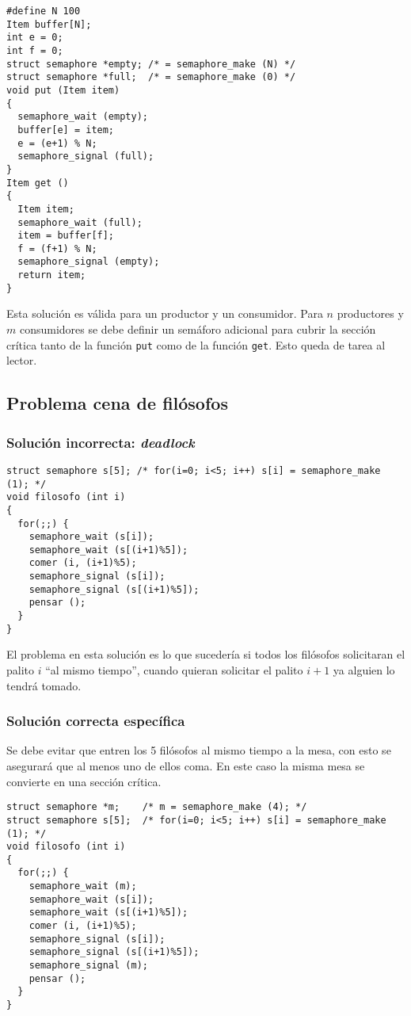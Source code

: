 \begin{lstlisting}
#define N 100
Item buffer[N];
int e = 0;
int f = 0;
struct semaphore *empty; /* = semaphore_make (N) */
struct semaphore *full;  /* = semaphore_make (0) */
void put (Item item)
{
  semaphore_wait (empty);
  buffer[e] = item;
  e = (e+1) % N;
  semaphore_signal (full);
}
Item get ()
{
  Item item;
  semaphore_wait (full);
  item = buffer[f];
  f = (f+1) % N;
  semaphore_signal (empty);
  return item;
}
\end{lstlisting}

Esta solución es válida para un productor y un consumidor. Para $n$ productores
y $m$ consumidores se debe definir un semáforo adicional para cubrir la sección
crítica tanto de la función \texttt{put} como de la función \texttt{get}. Esto
queda de tarea al lector.

\subsection{Problema cena de filósofos}

\subsubsection{Solución incorrecta: \emph{deadlock}}

\begin{lstlisting}
struct semaphore s[5]; /* for(i=0; i<5; i++) s[i] = semaphore_make (1); */
void filosofo (int i)
{
  for(;;) {
    semaphore_wait (s[i]);
    semaphore_wait (s[(i+1)%5]);
    comer (i, (i+1)%5);
    semaphore_signal (s[i]);
    semaphore_signal (s[(i+1)%5]);
    pensar ();
  }
}
\end{lstlisting}

El problema en esta solución es lo que sucedería si todos los filósofos
solicitaran el palito $i$ ``al mismo tiempo'', cuando quieran solicitar el
palito $i+1$ ya alguien lo tendrá tomado.

\subsubsection{Solución correcta específica}
Se debe evitar que entren los 5 filósofos al mismo tiempo a la mesa, con esto se
asegurará que al menos uno de ellos coma. En este caso la misma mesa se
convierte en una sección crítica.

\begin{lstlisting}
struct semaphore *m;    /* m = semaphore_make (4); */
struct semaphore s[5];  /* for(i=0; i<5; i++) s[i] = semaphore_make (1); */
void filosofo (int i)
{
  for(;;) {
    semaphore_wait (m);
    semaphore_wait (s[i]);
    semaphore_wait (s[(i+1)%5]);
    comer (i, (i+1)%5);
    semaphore_signal (s[i]);
    semaphore_signal (s[(i+1)%5]);
    semaphore_signal (m);
    pensar ();
  }
}
\end{lstlisting}

